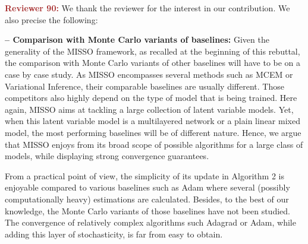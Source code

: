 \documentclass{article}
\begin{document}
\medskip
\textbf{\textcolor{brown}{Reviewer 90:}} We thank the reviewer for the interest in our contribution. We also precise the following: 

\vspace{0.03in}
\textbf{-- Comparison with Monte Carlo variants of baselines:}
Given the generality of the MISSO framework, as recalled at the beginning of this rebuttal, the comparison with Monte Carlo variants of other baselines will have to be on a case by case study.
As MISSO encompasses several methods such as MCEM or Variational Inference, their comparable baselines are usually different.
Those competitors also highly depend on the type of model that is being trained. 
Here again, MISSO aims at tackling a large collection of latent variable models.
Yet, when this latent variable model is a multilayered network or a plain linear mixed model, the most performing baselines will be of different nature.
Hence, we argue that MISSO enjoys from its broad scope of possible algorithms for a large class of models, while displaying strong convergence guarantees.

From a practical point of view, the simplicity of its update in Algorithm 2 is enjoyable compared to various baselines such as Adam where several (possibly computationally heavy) estimations are calculated.
Besides, to the best of our knowledge, the Monte Carlo variants of those baselines have not been studied.
The convergence of relatively complex algorithms such Adagrad or Adam, while adding this layer of stochasticity, is far from easy to obtain.
\end{document}

